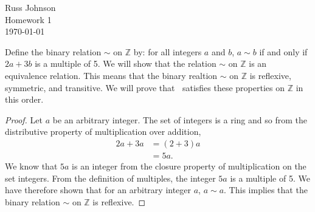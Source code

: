 \documentclass[12pt]{article}
\begin{document}
\begin{flushright}
Russ Johnson\\
Homework 1\\
\today\\
\end{flushright}
Define the binary relation $\sim$ on $\mathbb{Z}$ by: for all integers $a$ and $b$, $a\sim b$ if and only if $2a+3b$ is a multiple of 5. We will show that the relation $\sim$ on $\mathbb{Z}$ is an equivalence relation. This means that the binary realtion $\sim$ on $\mathbb{Z}$ is reflexive, symmetric, and transitive. We will prove that $~$ satisfies these properties on $\mathbb{Z}$ in this order.

\begin{proof}
Let $a$ be an arbitrary integer. The set of integers is a ring and so from the distributive property of multiplication over addition,
\begin{align*}
2a+3a &= (2+3)a \\
&= 5a.
\end{align*}
We know that $5a$ is an integer from the closure property of multiplication on the set integers. From the definition of multiples, the integer $5a$ is a multiple of 5. We have therefore shown that for an arbitrary integer $a$, $a\sim a$. This implies that the binary relation $\sim$ on $\mathbb{Z}$ is reflexive.
\end{proof}
\end{document}
